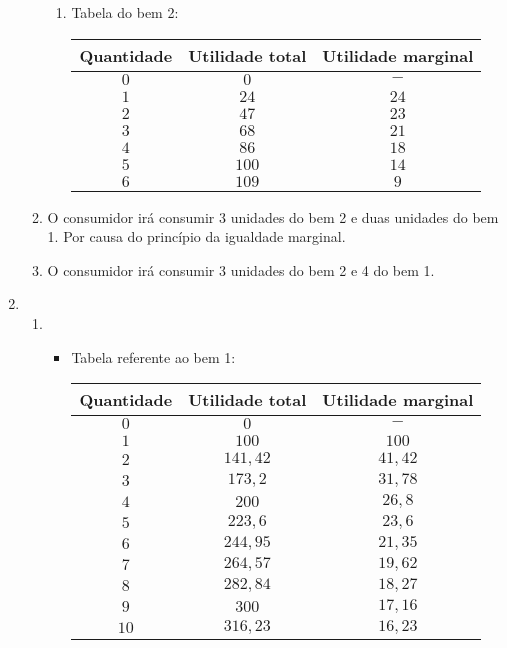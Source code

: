 \documentclass[a4paper, 12pt]{article}
\begin{document}
\begin{enumerate}
\begin{enumerate}
\begin{enumerate}
		\item Tabela do bem 2:
		\begin{table}[H]
			\centering
			\begin{tabular}{|c|c|c|}
				\hline
				Quantidade & Utilidade total & Utilidade marginal \\ \hline
				$0$ & $0$ & $-$\\ \hline
				$1$ & $24$ & $24$\\ \hline
				$2$ & $47$ & $23$\\ \hline
				$3$ & $68$ & $21$\\ \hline
				$4$ & $86$ & $18$\\ \hline
				$5$ & $100$ & $14$\\ \hline
				$6$ & $109$ & $9$\\ \hline
				\end{tabular}
			\end{table}
		\end{enumerate}
		
		\item O consumidor irá consumir 3 unidades do bem 2 e duas unidades do bem 1. Por causa do princípio da igualdade marginal.\\
		
		\item O consumidor irá consumir 3 unidades do bem 2 e 4 do bem 1.\\
	\end{enumerate}

	\newpage
	
	\item %
	\begin{enumerate}
		\item
		\begin{itemize}
			\item Tabela referente ao bem 1:
			\begin{table}[H]
				\centering
				\begin{tabular}{|c|c|c|}
					\hline
					Quantidade & Utilidade total & Utilidade marginal \\ \hline
					$0$ & $0$ & $-$\\ \hline
					$1$ & $100$ & $100$\\ \hline
					$2$ & $141,42$ & $41,42$\\ \hline
					$3$ & $173,2$ & $31,78$\\ \hline
					$4$ & $200$ & $26,8$\\ \hline
					$5$ & $223,6$ & $23,6$\\ \hline
					$6$ & $244,95$ & $21,35$\\ \hline
					$7$ & $264,57$ & $19,62$\\ \hline
					$8$ & $282,84$ & $18,27$\\ \hline
					$9$ & $300$ & $17,16$\\ \hline
					$10$ & $316,23$ & $16,23$\\ \hline
				\end{tabular}
			\end{table}\\


\end{itemize}
\end{enumerate}
\end{enumerate}
\end{document}
